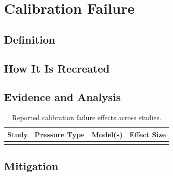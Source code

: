 \section{Calibration Failure}
\label{sec:calibration_failure}

\subsection{Definition}
\label{sec:calibration_failure_definition}

\subsection{How It Is Recreated}
\label{sec:calibration_failure_elicitation}

\subsection{Evidence and Analysis}
\label{sec:calibration_failure_evidence}

\begin{table}[t]
\centering
\caption{Reported calibration failure effects across studies.}
\label{tab:calibration_failure_evidence}
\begin{tabular}{llll}
\toprule
\textbf{Study} & \textbf{Pressure Type} & \textbf{Model(s)} & \textbf{Effect Size} \\
\midrule
 & & & \\
\bottomrule
\end{tabular}
\end{table}

\subsection{Mitigation}
\label{sec:calibration_failure_mitigation}
